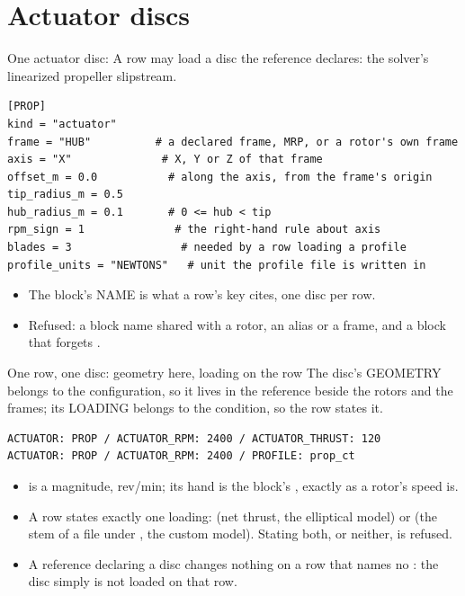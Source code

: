 %
\section{Actuator discs}

\begin{frame}[fragile]{One actuator disc: }
\small A row may load a disc the reference declares: the solver's
linearized propeller slipstream.
\begin{lstlisting}[basicstyle=\ttfamily\scriptsize,numbers=none]
[PROP]
kind = "actuator"
frame = "HUB"          # a declared frame, MRP, or a rotor's own frame
axis = "X"              # X, Y or Z of that frame
offset_m = 0.0           # along the axis, from the frame's origin
tip_radius_m = 0.5
hub_radius_m = 0.1       # 0 <= hub < tip
rpm_sign = 1              # the right-hand rule about axis
blades = 3                 # needed by a row loading a profile
profile_units = "NEWTONS"   # unit the profile file is written in
\end{lstlisting}
\begin{itemize}\small
  \item The block's NAME is what a row's  key cites, one
        disc per row.
  \item Refused: a block name shared with a rotor, an alias or a frame,
        and a block that forgets .
\end{itemize}
\end{frame}

\begin{frame}[fragile]{One row, one disc: geometry here, loading on the row}
\small The disc's GEOMETRY belongs to the configuration, so it lives in the
reference beside the rotors and the frames; its LOADING belongs to the
condition, so the row states it.
\begin{lstlisting}[basicstyle=\ttfamily\scriptsize,numbers=none]
ACTUATOR: PROP / ACTUATOR_RPM: 2400 / ACTUATOR_THRUST: 120
ACTUATOR: PROP / ACTUATOR_RPM: 2400 / PROFILE: prop_ct
\end{lstlisting}
\begin{itemize}\small
  \item {} is a magnitude, rev/min; its hand is the
        block's , exactly as a rotor's speed is.
  \item A row states exactly one loading:  (net
        thrust, the elliptical model) or  (the stem of a
        file under , the custom model). Stating
        both, or neither, is refused.
  \item A reference declaring a disc changes nothing on a row that names
        no : the disc simply is not loaded on that row.
\end{itemize}
\end{frame}
